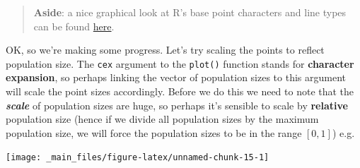 \documentclass[]{book}
\newenvironment{Shaded}{\begin{snugshade}}{\end{snugshade}}
\newcommand{\KeywordTok}[1]{\textcolor[rgb]{0.13,0.29,0.53}{\textbf{{#1}}}}
\newcommand{\DataTypeTok}[1]{\textcolor[rgb]{0.13,0.29,0.53}{{#1}}}
\newcommand{\DecValTok}[1]{\textcolor[rgb]{0.00,0.00,0.81}{{#1}}}
\newcommand{\StringTok}[1]{\textcolor[rgb]{0.31,0.60,0.02}{{#1}}}
\newcommand{\NormalTok}[1]{{#1}}
\theoremstyle{definition}
\theoremstyle{definition}
\theoremstyle{definition}
\theoremstyle{remark}
\begin{document}
\begin{quote}
\textbf{Aside}: a nice graphical look at R's base point characters and
line types can be found
\href{http://www.statmethods.net/advgraphs/parameters.html}{here}.
\end{quote}

OK, so we're making some progress. Let's try scaling the points to
reflect population size. The \texttt{cex} argument to the
\texttt{plot()} function stands for \textbf{character expansion}, so
perhaps linking the vector of population sizes to this argument will
scale the point sizes accordingly. Before we do this we need to note
that the \textbf{\emph{scale}} of population sizes are huge, so perhaps
it's sensible to scale by \textbf{relative} population size (hence if we
divide all population sizes by the maximum population size, we will
force the population sizes to be in the range \([0, 1]\)) e.g.

\begin{Shaded}
\end{Shaded}

\begin{center}\texttt{[image: \_main\_files/figure-latex/unnamed-chunk-15-1]} \end{center}
\end{document}
